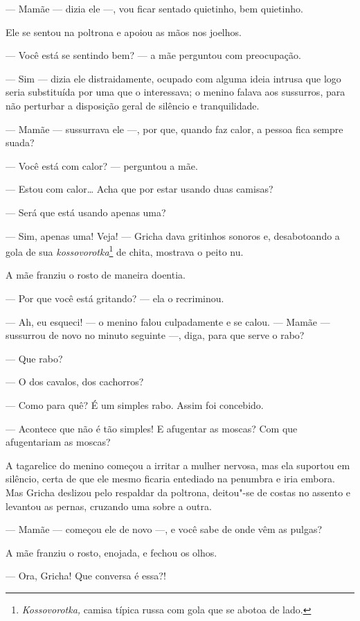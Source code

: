 --- Mamãe --- dizia ele ---, vou ficar sentado quietinho, bem quietinho.

Ele se sentou na poltrona e apoiou as mãos nos joelhos.

--- Você está se sentindo bem? --- a mãe perguntou com preocupação.

--- Sim --- dizia ele distraidamente, ocupado com alguma ideia intrusa
que logo seria substituída por uma que o interessava; o menino falava
aos sussurros, para não perturbar a disposição geral de silêncio e
tranquilidade.

--- Mamãe --- sussurrava ele ---, por que, quando faz calor, a pessoa
fica sempre suada?

--- Você está com calor? --- perguntou a mãe.

--- Estou com calor\ldots{} Acha que por estar usando duas camisas?

--- Será que está usando apenas uma?

--- Sim, apenas uma! Veja! --- Gricha dava gritinhos sonoros e,
desabotoando a gola de sua \emph{kossovorotka}\footnote{\emph{Kossovorotka,}
  camisa típica russa com gola que se abotoa de lado.} de chita,
mostrava o peito nu.

A mãe franziu o rosto de maneira doentia.

--- Por que você está gritando? --- ela o recriminou.

--- Ah, eu esqueci! --- o menino falou culpadamente e se calou. ---
Mamãe --- sussurrou de novo no minuto seguinte ---, diga, para que serve
o rabo?

--- Que rabo?

--- O dos cavalos, dos cachorros?

--- Como para quê? É um simples rabo. Assim foi concebido.

--- Acontece que não é tão simples! E afugentar as moscas? Com que
afugentariam as moscas?

A tagarelice do menino começou a irritar a mulher nervosa, mas ela
suportou em silêncio, certa de que ele mesmo ficaria entediado na
penumbra e iria embora. Mas Gricha deslizou pelo respaldar da poltrona,
deitou"-se de costas no assento e levantou as pernas, cruzando uma sobre
a outra.

--- Mamãe --- começou ele de novo ---, e você sabe de onde vêm as
pulgas?

A mãe franziu o rosto, enojada, e fechou os olhos.

--- Ora, Gricha! Que conversa é essa?!

